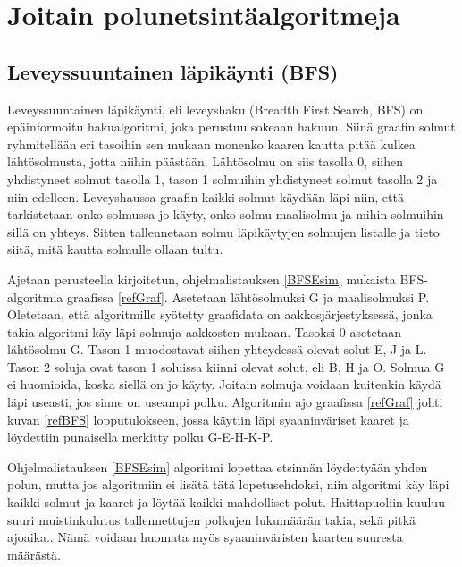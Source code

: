 \chapter{Joitain polunetsintäalgoritmeja}\label{joitainP}

\section{Leveyssuuntainen läpikäynti (BFS)}\label{bfs}
Leveyssuuntainen läpikäynti, eli leveyshaku (Breadth First Search, BFS) on 
epäinformoitu hakualgoritmi, joka perustuu sokeaan 
hakuun.\cite{applSciLawande} Siinä graafin solmut ryhmitellään eri tasoihin 
sen mukaan monenko kaaren kautta pitää kulkea lähtösolmusta, jotta niihin 
päästään. Lähtösolmu on siis tasolla 0, siihen yhdistyneet solmut tasolla 1, 
tason 1 solmuihin yhdistyneet solmut tasolla 2 ja niin edelleen. 
Leveyshaussa graafin kaikki solmut käydään läpi niin, että tarkistetaan 
onko solmussa jo käyty, onko solmu maalisolmu ja mihin solmuihin sillä on 
yhteys. Sitten tallennetaan solmu läpikäytyjen solmujen listalle ja tieto 
siitä, mitä kautta solmulle ollaan tultu.\cite{BFSRahim} \par
	Ajetaan \textcite{applSciLawande} perusteella 
kirjoitetun, ohjelmalistauksen \ref{BFSEsim} mukaista BFS-algoritmia graafissa 
\ref{refGraf}. Asetetaan lähtösolmuksi G ja maalisolmuksi P. Oletetaan, että 
algoritmille syötetty graafidata on aakkosjärjestyksessä, jonka takia 
algoritmi käy läpi solmuja aakkosten mukaan. Tasoksi 0 asetetaan lähtösolmu G. 
Tason 1 muodostavat siihen yhteydessä olevat solut E, J ja L. Tason 2 soluja 
ovat tason 1 soluissa kiinni olevat solut, eli B, H ja O. Solmua G ei 
huomioida, koska siellä on jo käyty. Joitain solmuja voidaan kuitenkin käydä 
läpi useasti, jos sinne on useampi polku. Algoritmin ajo graafissa 
\ref{refGraf} johti kuvan \ref{refBFS} lopputulokseen, jossa käytiin läpi 
syaaninväriset kaaret ja löydettiin punaisella merkitty polku G-E-H-K-P. \par
	Ohjelmalistauksen \ref{BFSEsim} algoritmi lopettaa etsinnän 
löydettyään yhden polun, mutta jos algoritmiin ei lisätä tätä lopetusehdoksi, 
niin algoritmi käy läpi kaikki solmut ja kaaret ja löytää kaikki mahdolliset 
polut.\cite{BFSRahim} Haittapuoliin kuuluu suuri muistinkulutus tallennettujen 
polkujen lukumäärän takia,\cite{BFSRahim} sekä pitkä 
ajoaika.\cite{mazeGameTrilogi}. Nämä voidaan huomata myös syaaninväristen 
kaarten suuresta määrästä.

